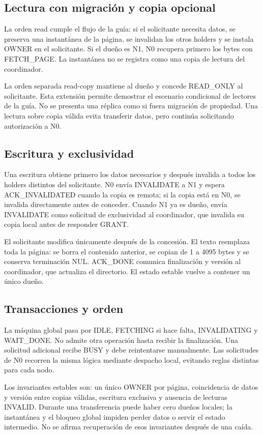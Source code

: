 \documentclass[conference]{IEEEtran}
\begin{document}
\subsection{Lectura con migración y copia opcional}
La orden read cumple el flujo de la guía: si el solicitante necesita datos, se preserva
una instantánea de la página, se invalidan los otros holders y se instala OWNER en el
solicitante. Si el dueño es N1, N0 recupera primero los bytes con FETCH\_PAGE. La
instantánea no se registra como una copia de lectura del coordinador.

La orden separada read-copy mantiene al dueño y concede READ\_ONLY al solicitante.
Esta extensión permite demostrar el escenario condicional de lectores de la guía.
No se presenta una réplica como si fuera migración de propiedad. Una lectura sobre
copia válida evita transferir datos, pero continúa solicitando autorización a N0.

\subsection{Escritura y exclusividad}
Una escritura obtiene primero los datos necesarios y después invalida a todos los
holders distintos del solicitante. N0 envía INVALIDATE a N1 y espera ACK\_INVALIDATED
cuando la copia es remota; si la copia está en N0, se invalida directamente antes de
conceder. Cuando N1 ya es dueño, envía INVALIDATE como solicitud de exclusividad al
coordinador, que invalida su copia local antes de responder GRANT.

El solicitante modifica únicamente después de la concesión. El texto reemplaza toda
la página: se borra el contenido anterior, se copian de 1 a 4095 bytes y se conserva
terminación NUL. ACK\_DONE comunica finalización y versión al coordinador, que actualiza
el directorio. El estado estable vuelve a contener un único dueño.

\subsection{Transacciones y orden}
La máquina global pasa por IDLE, FETCHING si hace falta, INVALIDATING y WAIT\_DONE.
No admite otra operación hasta recibir la finalización. Una solicitud adicional
recibe BUSY y debe reintentarse manualmente. Las solicitudes de N0 recorren la misma
lógica mediante despacho local, evitando reglas distintas para cada nodo.

Los invariantes estables son: un único OWNER por página, coincidencia de datos y versión
entre copias válidas, escritura exclusiva y ausencia de lecturas INVALID. Durante una
transferencia puede haber cero dueños locales; la instantánea y el bloqueo global
impiden perder datos o servir el estado intermedio. No se afirma recuperación de esos
invariantes después de una caída.
\end{document}
